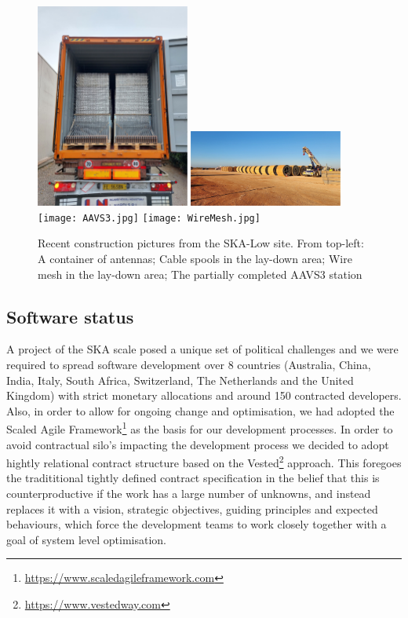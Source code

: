\documentclass[a4paper,
               biblatex,     %
               keeplastbox,   %
               ]{jacow}
\begin{document}
\begin{figure}[tb]
	\centering
  \includegraphics[width=0.45\textwidth]{Packed Antennas.jpg}
  \includegraphics[width=0.45\textwidth]{Cables.jpg}\\
  \texttt{[image: AAVS3.jpg]}
  \texttt{[image: WireMesh.jpg]}
    
	\caption{Recent construction pictures from the SKA-Low site. From top-left: A container of antennas; Cable spools in the lay-down area; Wire mesh in the lay-down area; The partially completed AAVS3 station
	}
	\label{fig:low-construction}
  \end{figure}

\subsection{Software status}
A project of the SKA scale posed a unique set of political challenges and we were required to spread software development over 8 countries (Australia, China, India, Italy, South Africa, Switzerland, The Netherlands and the United Kingdom) with strict monetary allocations and around 150 contracted developers. Also, in order to allow for ongoing change and optimisation, we had adopted the Scaled Agile Framework\footnote{\url{https://www.scaledagileframework.com}} as the basis for our development processes. In order to avoid contractual silo's impacting the development process we decided to adopt hightly relational contract structure based on the Vested\footnote{\url{https://www.vestedway.com}} approach. This foregoes the tradititional tightly defined contract specification in the belief that this is counterproductive if the work has a large number of unknowns, and instead replaces it with a vision, strategic objectives, guiding principles and expected behaviours, which force the development teams to work closely together with a goal of system level optimisation.
\end{document}
